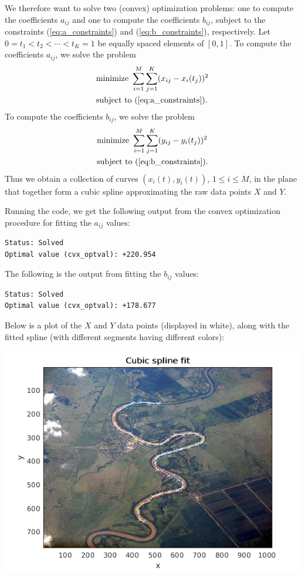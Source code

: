 \documentclass[letterpaper,12pt]{article}
\begin{document}
\begin{enumerate}
  We therefore want to solve two (convex) optimization problems: one
  to compute the coefficients $a_{ij}$ and one to compute the
  coefficients $b_{ij}$, subject to the constraints
  (\ref{eq:a_constraints}) and (\ref{eq:b_constraints}),
  respectively. Let $0 = t_1 < t_2 < \cdots < t_K = 1$ be equally
  spaced elements of $[0, 1]$. To compute the coefficients $a_{ij}$,
  we solve the problem
  \begin{align*}
    &\text{minimize} \ \sum_{i=1}^M \sum_{j=1}^K (x_{ij} - x_i(t_j))^2 \\
    &\text{subject to} \ (\ref{eq:a_constraints}).
  \end{align*}
  To compute the coefficients $b_{ij}$, we solve the problem
  \begin{align*}
    &\text{minimize} \ \sum_{i=1}^M \sum_{j=1}^K (y_{ij} - y_i(t_j))^2 \\
    &\text{subject to} \ (\ref{eq:b_constraints}).
  \end{align*}
  Thus we obtain a collection of curves $(x_i(t), y_i(t))$,
  $1 \leq i \leq M$, in the plane that together form a cubic spline
  approximating the raw data points $X$ and $Y$.

  Running the code, we get the following output from the convex
  optimization procedure for fitting the $a_{ij}$ values:
  \begin{verbatim}
Status: Solved
Optimal value (cvx_optval): +220.954
  \end{verbatim}
  The following is the output from fitting the $b_{ij}$ values:
  \begin{verbatim}
Status: Solved
Optimal value (cvx_optval): +178.677
  \end{verbatim}
  Below is a plot of the $X$ and $Y$ data points (displayed in white),
  along with the fitted spline (with different segments having
  different colors):
  \begin{center}
    \includegraphics[width=15cm]{spline.png}
  \end{center}

\end{enumerate}
\end{document}
